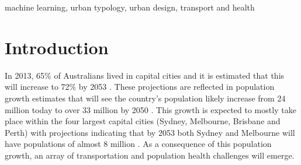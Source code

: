 \documentclass[final,3p,times,authoryear]{elsarticle}
\begin{document}
\begin{frontmatter}
\begin{abstract}
\end{abstract}

\begin{keyword}
machine learning, urban typology, urban design, transport and health



\end{keyword}

\end{frontmatter}









\section{Introduction}\label{sec:introduction}



 
In 2013, 65\% of Australians lived in capital cities and it is estimated that this will increase to 72\% by 2053  \citep{ABS2008}. These projections are reflected in population growth estimates that will see the country's population likely increase from 24 million today to over 33 million by 2050  \citep{ABS2008}. This growth is expected to mostly take place within the four largest capital cities (Sydney, Melbourne, Brisbane and Perth) with projections indicating that by 2053 both Sydney and Melbourne will have populations of almost 8 million  \citep{CommonwealthofAustralia2010}. As a consequence of this population growth, an array of transportation and population health challenges will emerge.
\end{document}
